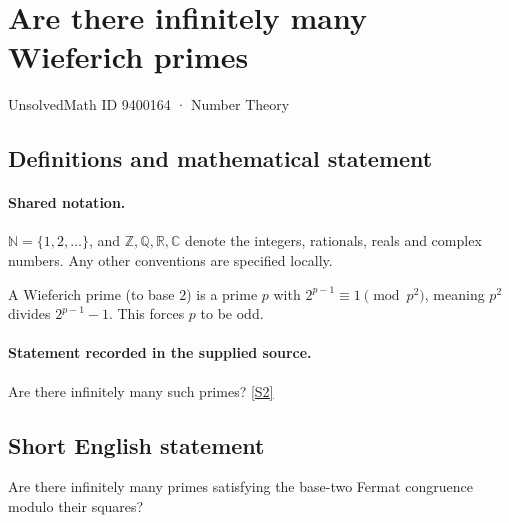 \documentclass[11pt]{article}
\newcommand{\sref}[2]{\hyperlink{source:#1:#2}{[S#2]}}
\begin{document}
\setcounter{section}{9400163}
\section{Are there infinitely many Wieferich primes}\label{9400164}
{\small\sffamily UnsolvedMath ID 9400164 · Number Theory}
\subsection{Definitions and mathematical statement}

\paragraph{Shared notation.}$\mathbb N=\{1,2,\ldots\}$, and $\mathbb Z,\mathbb Q,\mathbb R,\mathbb C$ denote the integers, rationals, reals and complex numbers. Any other conventions are specified locally.


A Wieferich prime (to base $2$) is a prime $p$ with $2^{p-1}\equiv1\pmod{p^2}$, meaning $p^2$ divides $2^{p-1}-1$. This forces $p$ to be odd.
\paragraph{Statement recorded in the supplied source.}
Are there infinitely many such primes? \sref{9400164}{2}
\subsection{Short English statement}
Are there infinitely many primes satisfying the base-two Fermat congruence modulo their squares?
\end{document}
